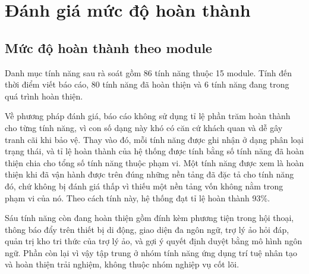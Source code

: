 \documentclass[12pt,a4paper,oneside]{report}
\begin{document}
\section{Đánh giá mức độ hoàn thành}

\subsection{Mức độ hoàn thành theo module}

Danh mục tính năng sau rà soát gồm 86 tính năng thuộc 15 module. Tính đến thời điểm viết báo cáo, 80 tính năng đã hoàn thiện và 6 tính năng đang trong quá trình hoàn thiện.

Về phương pháp đánh giá, báo cáo không sử dụng tỉ lệ phần trăm hoàn thành cho từng tính năng, vì con số dạng này khó có căn cứ khách quan và dễ gây tranh cãi khi bảo vệ. Thay vào đó, mỗi tính năng được ghi nhận ở dạng phân loại trạng thái, và tỉ lệ hoàn thành của hệ thống được tính bằng số tính năng đã hoàn thiện chia cho tổng số tính năng thuộc phạm vi. Một tính năng được xem là hoàn thiện khi đã vận hành được trên đúng những nền tảng đã đặc tả cho tính năng đó, chứ không bị đánh giá thấp vì thiếu một nền tảng vốn không nằm trong phạm vi của nó. Theo cách tính này, hệ thống đạt tỉ lệ hoàn thành 93\%.

Sáu tính năng còn đang hoàn thiện gồm đính kèm phương tiện trong hội thoại, thông báo đẩy trên thiết bị di động, giao diện đa ngôn ngữ, trợ lý ảo hỏi đáp, quản trị kho tri thức của trợ lý ảo, và gợi ý quyết định duyệt bằng mô hình ngôn ngữ. Phần còn lại vì vậy tập trung ở nhóm tính năng ứng dụng trí tuệ nhân tạo và hoàn thiện trải nghiệm, không thuộc nhóm nghiệp vụ cốt lõi.
\end{document}
